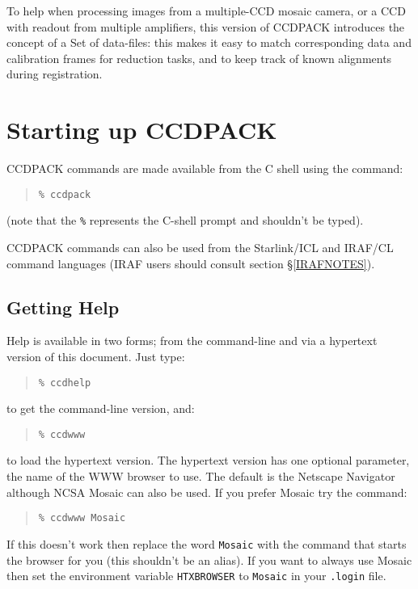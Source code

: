 \documentclass[twoside,11pt]{article}
\newcommand{\htmladdnormallink}[2]{#1}
\newcommand{\latexhtml}[2]{#1}
\newcommand{\xref}[3]{#1}
\newcommand{\xlabel}[1]{}
\renewcommand{\_}{\texttt{\symbol{95}}}
\newcommand{\ttsize}{\latexhtml{\small}{}}
\newenvironment{myquote}{\begin{quote}\ttsize}{\end{quote}}
\newcommand{\text}[1]{{\ttsize \tt #1}}
\begin{document}
To help when processing images from a multiple-CCD mosaic camera,
or a CCD with readout from multiple amplifiers,
this version of CCDPACK introduces the concept of a
Set of data-files: this makes it easy to match
corresponding data and calibration frames for reduction tasks,
and to keep track of known alignments during registration.
\section{\xlabel{startup}Starting up CCDPACK}

CCDPACK commands are made available from the C shell using the command:
\begin{myquote}
\begin{verbatim}
% ccdpack
\end{verbatim}
\end{myquote}
(note that the \text{\%} represents the C-shell prompt and shouldn't be typed).

CCDPACK commands can also be used from the Starlink/\xref{ICL}{sg5}{}
and IRAF/CL command languages (IRAF users should consult section
\S\ref{IRAFNOTES}).

\subsection{\xlabel{gettinghelp}Getting Help}

Help is available in two forms; from the command-line and via a
hypertext version of this document.
Just type:
\begin{myquote}
\begin{verbatim}
% ccdhelp
\end{verbatim}
\end{myquote}
to get the command-line version, and:
\begin{myquote}
\begin{verbatim}
% ccdwww
\end{verbatim}
\end{myquote}
to load the hypertext version. The hypertext version has one optional
parameter, the name of the WWW browser to use. The default is
\htmladdnormallink{the Netscape Navigator}{http://home.netscape.com/}
although
\htmladdnormallink{NCSA Mosaic}
{http://www.ncsa.uiuc.edu/SDG/Software/Mosaic/Docs/help-about.html}
can also be used. If you prefer Mosaic try the command:
\begin{myquote}
\begin{verbatim}
% ccdwww Mosaic
\end{verbatim}
\end{myquote}
If this doesn't work then replace the word \text{Mosaic} with the
command that starts the browser for you (this shouldn't be an alias).
If you want to always use Mosaic then set the environment variable
\text{HTX\_BROWSER} to \text{Mosaic} in your \text{.login} file.
\end{document}
